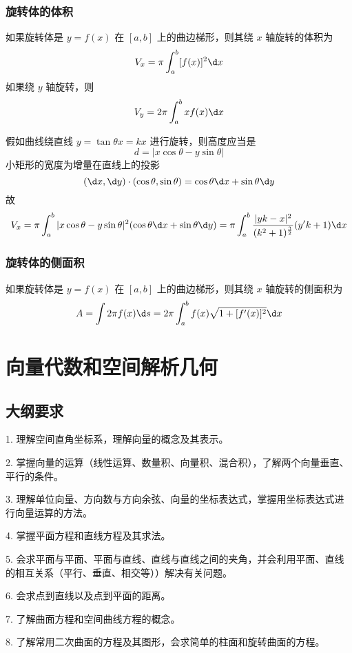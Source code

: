 \subsubsection*{旋转体的体积}

如果旋转体是 $y = f(x)$ 在 $[a, b]$ 上的曲边梯形，则其绕 $x$ 轴旋转的体积为
\[ V_x = \pi \int_a^b [f(x)]^2 \d x \]
如果绕 $y$ 轴旋转，则
\[ V_y = 2\pi \int_{a}^{b} x f(x) \d x \]

假如曲线绕直线 $y = \tan \theta x = k x$ 进行旋转，则高度应当是
\[ d = |x \cos \theta - y \sin \theta| \]
小矩形的宽度为增量在直线上的投影
\[ (\d x, \d y) \cdot (\cos \theta, \sin \theta) = \cos \theta \d x + \sin \theta \d y \]
故
\[ V_x = \pi \int_a^b |x \cos \theta - y \sin \theta|^2(\cos \theta \d x + \sin \theta \d y) = \pi \int_a^b \frac{|yk-x|^2}{(k^2+1)^{\frac{3}{2}}}(y'k+1) \d x \]

\subsubsection*{旋转体的侧面积}

如果旋转体是 $y = f(x)$ 在 $[a, b]$ 上的曲边梯形，则其绕 $x$ 轴旋转的侧面积为
\[ A = \int 2\pi f(x) \d s = 2\pi \int_{a}^{b} f(x) \sqrt{1 + [f'(x)]^2} \d x \]


\section{向量代数和空间解析几何}

\subsection{大纲要求}

1. 理解空间直角坐标系，理解向量的概念及其表示。

2. 掌握向量的运算（线性运算、数量积、向量积、混合积），了解两个向量垂直、平行的条件。

3. 理解单位向量、方向数与方向余弦、向量的坐标表达式，掌握用坐标表达式进行向量运算的方法。

4. 掌握平面方程和直线方程及其求法。

5. 会求平面与平面、平面与直线、直线与直线之间的夹角，并会利用平面、直线的相互关系（平行、垂直、相交等））解决有关问题。

6. 会求点到直线以及点到平面的距离。

7. 了解曲面方程和空间曲线方程的概念。

8. 了解常用二次曲面的方程及其图形，会求简单的柱面和旋转曲面的方程。

